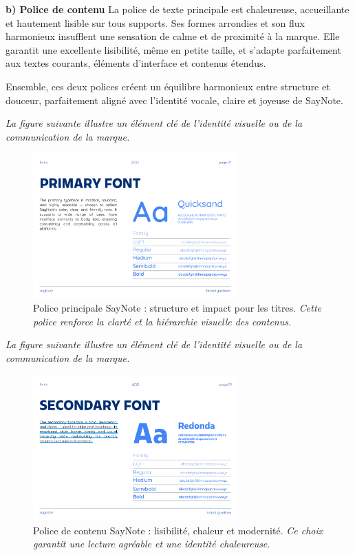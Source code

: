 \textbf{b) Police de contenu}
La police de texte principale est chaleureuse, accueillante et hautement lisible sur tous supports. Ses formes arrondies et son flux harmonieux insufflent une sensation de calme et de proximité à la marque. Elle garantit une excellente lisibilité, même en petite taille, et s’adapte parfaitement aux textes courants, éléments d’interface et contenus étendus.

Ensemble, ces deux polices créent un équilibre harmonieux entre structure et douceur, parfaitement aligné avec l’identité vocale, claire et joyeuse de SayNote.

\noindent
\textit{La figure suivante illustre un élément clé de l'identité visuelle ou de la communication de la marque.}
\begin{figure}[H]
    \centering
    \includegraphics[width=0.7\textwidth]{docs/visual-indentity/pictures/primary-font.png}
    \caption{Police principale SayNote : structure et impact pour les titres. \newline\textit{Cette police renforce la clarté et la hiérarchie visuelle des contenus.}}
\end{figure}
\noindent
\textit{La figure suivante illustre un élément clé de l'identité visuelle ou de la communication de la marque.}
\begin{figure}[H]
    \centering
    \includegraphics[width=0.7\textwidth]{docs/visual-indentity/pictures/secondery-font.png}
    \caption{Police de contenu SayNote : lisibilité, chaleur et modernité. \newline\textit{Ce choix garantit une lecture agréable et une identité chaleureuse.}}
\end{figure}

